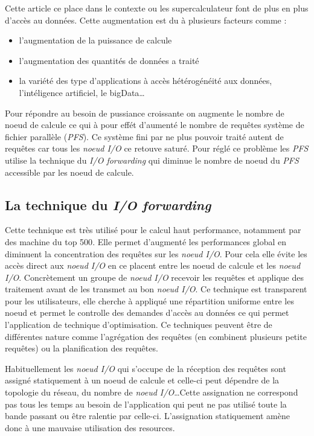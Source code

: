 \documentclass[10pt, a4paper]{article}
\begin{document}
Cette article ce place dans le contexte ou les supercalculateur font de plus en plus d'accès au données. Cette augmentation est du à plusieurs facteurs comme :
\begin{itemize}
  \item l'augmentation de la puissance de calcule
  \item l'augmentation des quantités de données a traité
  \item la variété des type d'applications à accès hétérogénéité aux données, l'intéligence artificiel, le bigData\dots
\end{itemize}
Pour répondre au besoin de pussiance croissante on augmente le nombre de noeud de calcule ce qui à pour effét d'aumenté le nombre de requêtes système de fichier parallèle (\emph{PFS}). Ce système fini par ne plus pouvoir traité autent de requêtes car tous les \emph{noeud I/O} ce retouve saturé. Pour réglé ce problème les \emph{PFS} utilise la technique du \emph{I/O forwarding} qui diminue le nombre de noeud du \emph{PFS} accessible par les noeud de calcule.

\subsection{La technique du \emph{I/O forwarding}}

Cette technique est très utilisé pour le calcul haut performance, notamment par des machine du top 500\cite{}. Elle permet d'augmenté les performances global en diminuent la concentration des requêtes sur les \emph{noeud I/O}. Pour cela elle évite les accès direct aux \emph{noeud I/O} en ce placent entre les noeud de calcule et les \emph{noeud I/O}. Concrètement un groupe de \emph{noeud I/O} recevoir les requêtes et applique des traitement avant de les transmet au bon \emph{noeud I/O}. Ce technique est transparent pour les utilisateurs, elle cherche à appliqué une répartition uniforme entre les noeud et permet le controlle des demandes d'accès au données ce qui permet l'application de technique d'optimisation. Ce techniques peuvent être de différentes nature comme l'agrégation des requêtes (en combinent plusieurs petite requêtes) ou la planification des requêtes.

Habituellement les \emph{noeud I/O} qui s'occupe de la réception des requêtes sont assigné statiquement à un noeud de calcule et celle-ci peut dépendre de la topologie du réseau, du nombre de \emph{noeud I/O}\dots Cette assignation ne correspond pas tous les temps au besoin de l'application qui peut ne pas utilisé toute la bande passant ou être ralentie par celle-ci. L'assignation statiquement amène donc à une mauvaise utilisation des resources.
\end{document}
